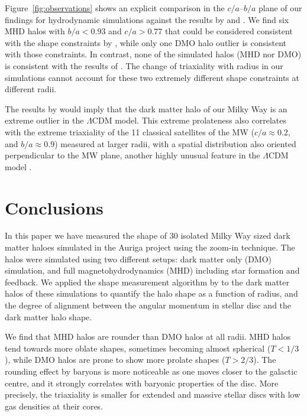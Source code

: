 \documentclass[usenatbib]{mnras}
\begin{document}
Figure~\ref{fig:observations} shows an explicit comparison in
the $c/a$--$b/a$ plane of our findings for hydrodynamic simulations against the
results by \cite{LM10} and \cite{Bovy16}.
We find six MHD halos with $b/a<0.93$ and $c/a>0.77$ that could be
considered consistent with the shape constraints  by \citet{Bovy16}, while
only one DMO halo outlier  is consistent with those constraints.
In contrast, none of the simulated halos (MHD nor DMO) is consistent
with the results of \citet{LM10}. The change of triaxiality with radius in 
our simulations cannot account for these two extremely different 
shape constraints at different radii. 


The results by \citet{LM10} would imply that the dark matter halo of our Milky
Way is an extreme outlier in the $\Lambda$CDM model. 
This extreme prolateness also correlates with the extreme triaxiality
of the 11 classical satellites of the MW ($c/a\approx 0.2$, and
$b/a\approx0.9$) measured at larger radii, with a spatial
distribution  also oriented perpendicular to the MW plane, another
highly unusual feature in the $\Lambda$CDM model \citep{2018MNRAS.478.5533F}. 






\section{Conclusions}
\label{sec:conclusions}

In this paper we have measured the shape of 30 isolated Milky Way sized
dark matter haloes simulated in the Auriga project using the zoom-in
technique. The halos were simulated using two different setups:
dark matter only (DMO) simulation, and full magnetohydrodynamics (MHD)
including star formation and feedback.
We applied the shape measurement algorithm by \cite{Allgood06} to the
dark matter halos of these simulations to quantify the halo shape as a
function of radius, and the degree of alignment between the angular
momentum in stellar disc and the dark matter halo shape. 

We find that MHD halos are rounder than DMO halos at all radii.
MHD halos tend towards more oblate shapes, sometimes becoming almost spherical
($T<1/3$), while DMO halos are prone to show more prolate shapes ($T>2/3$).  
The rounding effect by baryons is more noticeable as one moves closer to the galactic
centre, and it strongly  correlates with baryonic properties of the disc.
More precisely, the triaxiality is smaller for extended and massive
stellar discs with low gas densities at their cores.
\end{document}
